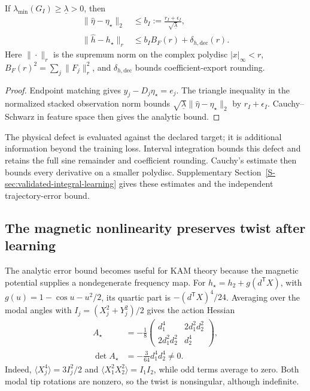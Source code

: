 \begin{proposition}
\label{core-prop-integral-bound}
If $\lambda_{\min}(G_I)\geq\underline\lambda>0$, then
\begin{equation}
 \begin{aligned}
  \|\widehat\eta-\eta_\star\|_2
   &\leq b_I:=\frac{r_I+\epsilon_I}{\sqrt{\underline\lambda}},\\
  \|\widehat h-h_\star\|_r
   &\leq b_I B_F(r)+\delta_{h,\mathrm{dec}}(r).
 \end{aligned}
 \label{core-eq-integral-bound}
\end{equation}
Here $\|\cdot\|_r$ is the supremum norm on the complex polydisc
$|x|_\infty<r$, $B_F(r)^2=\sum_j\|F_j\|_r^2$, and
$\delta_{h,\mathrm{dec}}$ bounds coefficient-export rounding.
\end{proposition}
\begin{proof}
Endpoint matching gives $y_j-D_j\eta_\star=e_j$.
The triangle inequality in the normalized stacked observation norm
bounds $\sqrt{\underline\lambda}\|\widehat\eta-\eta_\star\|_2$
by $r_I+\epsilon_I$. Cauchy--Schwarz in feature space then gives
the analytic bound.
\end{proof}
The physical defect is evaluated against the declared target; it is
additional information beyond the training loss. Interval integration
bounds this defect and retains the full sine remainder and coefficient
rounding. Cauchy's estimate then bounds every derivative on a smaller
polydisc. Supplementary Section~\ref{S-sec:validated-integral-learning}
gives these estimates and the independent trajectory-error bound.

\subsection{The magnetic nonlinearity preserves twist after learning}
\label{core-sec-twist}
The analytic error bound becomes useful for KAM theory because the
magnetic potential supplies a nondegenerate frequency map.
For $h_\star=h_2+g(d^{\mathsf T}X)$, with
$g(u)=1-\cos u-u^2/2$, its quartic part is
$-(d^{\mathsf T}X)^4/24$. Averaging over the modal angles with
$I_j=(X_j^2+Y_j^2)/2$ gives the action Hessian
\begin{equation}
 \begin{aligned}
 A_\star&=-\frac18
 \begin{pmatrix}
 d_1^4&2d_1^2d_2^2\\2d_1^2d_2^2&d_2^4
 \end{pmatrix},\\
 \det A_\star&=-\frac3{64}d_1^4d_2^4\ne0.
 \end{aligned}
 \label{core-eq-magnetic-twist}
\end{equation}
Indeed, $\langle X_j^4\rangle=3I_j^2/2$ and
$\langle X_1^2X_2^2\rangle=I_1I_2$, while odd terms average to zero.
Both modal tip rotations are nonzero, so the twist is nonsingular,
although indefinite.

